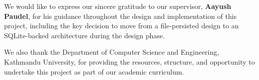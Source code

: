 We would like to express our sincere gratitude to our supervisor, \textbf{Aayush Paudel}, for his guidance throughout the design and implementation of this project, including the key decision to move from a file-persisted design to an SQLite-backed architecture during the design phase.

We also thank the Department of Computer Science and Engineering, Kathmandu University, for providing the resources, structure, and opportunity to undertake this project as part of our academic curriculum.